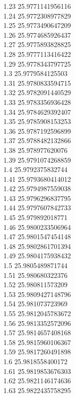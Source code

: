 {1.23	25.9771141956116\\
1.24	25.9772308977829\\
1.25	25.9773490647209\\
1.26	25.9774685926437\\
1.27	25.9775893828825\\
1.28	25.9777113416422\\
1.29	25.9778343797725\\
1.3	25.9779584125503\\
1.31	25.9780833594715\\
1.32	25.9782091440529\\
1.33	25.9783356936428\\
1.34	25.9784629392407\\
1.35	25.9785908153253\\
1.36	25.9787192596899\\
1.37	25.9788482132866\\
1.38	25.978977620076\\
1.39	25.9791074268859\\
1.4	25.9792375832744\\
1.41	25.9793680414012\\
1.42	25.9794987559038\\
1.43	25.9796296837795\\
1.44	25.9797607842733\\
1.45	25.979892018771\\
1.46	25.9800233506964\\
1.47	25.9801547454148\\
1.48	25.9802861701394\\
1.49	25.9804175938432\\
1.5	25.9805489871744\\
1.51	25.980680322376\\
1.52	25.980811573209\\
1.53	25.9809427148796\\
1.54	25.981073723969\\
1.55	25.9812045783672\\
1.56	25.9813352572096\\
1.57	25.9814657408168\\
1.58	25.9815960106367\\
1.59	25.9817260491898\\
1.6	25.9818558400172\\
1.61	25.9819853676303\\
1.62	25.9821146174636\\
1.63	25.9822435758295\\
}
